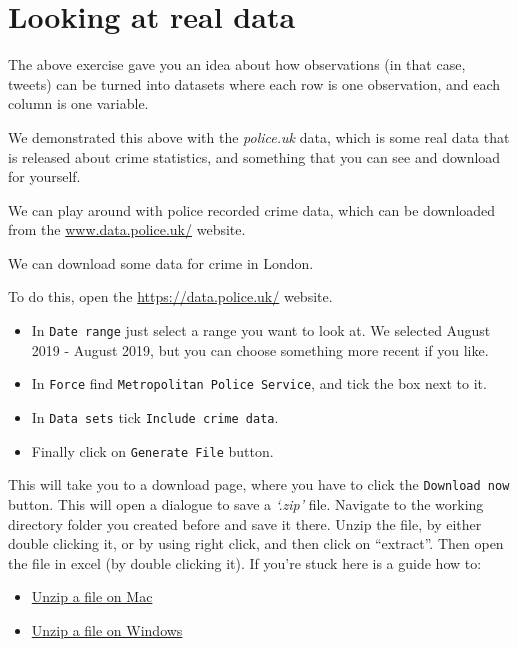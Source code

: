 \documentclass[
]{book}
\providecommand{\tightlist}{%
  \setlength{\itemsep}{0pt}\setlength{\parskip}{0pt}}
\begin{document}
\hypertarget{looking-at-real-data}{%
\section{Looking at real data}\label{looking-at-real-data}}

The above exercise gave you an idea about how observations (in that case, tweets) can be turned into datasets where each row is one observation, and each column is one variable.

We demonstrated this above with the \emph{police.uk} data, which is some real data that is released about crime statistics, and something that you can see and download for yourself.

We can play around with police recorded crime data, which can be downloaded from the \href{https://data.police.uk/}{www.data.police.uk/} website.

We can download some data for crime in London.

To do this, open the \url{https://data.police.uk/} website.

\begin{itemize}
\tightlist
\item
  In \texttt{Date\ range} just select a range you want to look at. We selected August 2019 - August 2019, but you can choose something more recent if you like.
\item
  In \texttt{Force} find \texttt{Metropolitan\ Police\ Service}, and tick the box next to it.
\item
  In \texttt{Data\ sets} tick \texttt{Include\ crime\ data}.
\item
  Finally click on \texttt{Generate\ File} button.
\end{itemize}

This will take you to a download page, where you have to click the \texttt{Download\ now} button. This will open a dialogue to save a \emph{`.zip'} file. Navigate to the working directory folder you created before and save it there. Unzip the file, by either double clicking it, or by using right click, and then click on ``extract''. Then open the file in excel (by double clicking it). If you're stuck here is a guide how to:

\begin{itemize}
\tightlist
\item
  \href{https://www.dummies.com/computers/macs/how-to-zip-and-unzip-files-on-your-mac/}{Unzip a file on Mac}
\item
  \href{https://support.microsoft.com/en-us/help/4028088/windows-10-zip-and-unzip-files}{Unzip a file on Windows}
\end{itemize}
\end{document}
